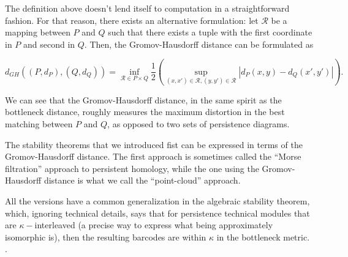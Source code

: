 The definition above doesn't lend itself to computation in a straightforward fashion. For that reason, there exists an alternative formulation: let $\mathcal{R}$ be a mapping between $P$ and $Q$ such that there exists a tuple with the first coordinate in $P$ and second in $Q$. Then, the Gromov-Hausdorff distance can be formulated as

\begin{equation*}
  d_{GH}((P, d_{P}), (Q, d_{Q})) = \inf_{\mathcal{R} \in P \times Q}\frac{1}{2}\left(\sup_{(x, x') \in \mathcal{R}, (y, y') \in \mathcal{R}} |d_{P}(x,y) - d_{Q}(x', y')| \right).
\end{equation*}

We can see that the Gromov-Hausdorff distance, in the same spirit as the bottleneck distance, roughly measures the maximum distortion in the best matching between $P$ and $Q$, as opposed to two sets of persistence diagrams.

The stability theorems that we introduced fist can be expressed in terms of the Gromov-Hausdorff distance. The first approach is sometimes called the ``Morse filtration'' approach to persistent homology, while the one using the Gromov-Hausdorff distance is what we call the ``point-cloud'' approach.

All the versions have a common generalization in the algebraic stability theorem, which, ignoring technical details, says that for persistence technical modules that are $\kappa-$interleaved (a precise way to express what being approximately isomorphic is), then the resulting barcodes are within $\kappa$ in the bottleneck metric. \cite{chazal2009proximity}.
